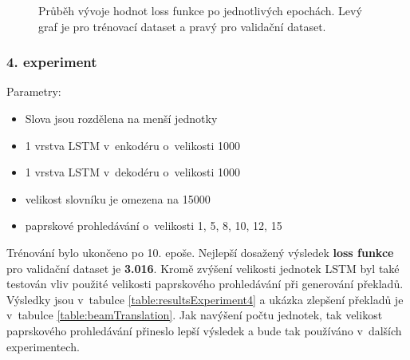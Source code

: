 \begin{figure}[H]
    \begin{center}
    \end{center}
	\caption{Průběh vývoje hodnot loss funkce po jednotlivých epochách. Levý graf je pro trénovací dataset a pravý pro validační dataset.}
\end{figure}

\subsubsection{4. experiment}\label{experiment4}
Parametry:
\begin{itemize}
  \item Slova jsou rozdělena na menší jednotky
  \item 1 vrstva LSTM v~enkodéru o~velikosti 1000
  \item 1 vrstva LSTM v~dekodéru o~velikosti 1000
  \item velikost slovníku je omezena na 15000
  \item paprskové prohledávání o~velikosti 1, 5, 8, 10, 12, 15
\end{itemize}

Trénování bylo ukončeno po 10. epoše. Nejlepší dosažený výsledek \textbf{loss funkce} pro validační dataset je \textbf{3.016}. Kromě zvýšení velikosti jednotek LSTM byl také testován vliv použité velikosti paprskového prohledávání při generování překladů. Výsledky jsou v~tabulce \ref{table:resultsExperiment4} a ukázka zlepšení překladů je v~tabulce \ref{table:beamTranslation}. Jak navýšení počtu jednotek, tak velikost paprskového prohledávání přineslo lepší výsledek a bude tak používáno v~dalších experimentech.

